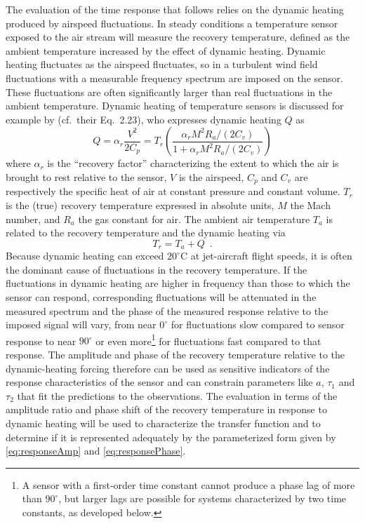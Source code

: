 \documentclass[11pt,twoside,american,12pt,twoside,american]{article}\usepackage[]{graphicx}\usepackage[]{color}
\begin{document}
The evaluation of the time response that follows relies on the dynamic
heating produced by airspeed fluctuations. In steady conditions a
temperature sensor exposed to the air stream will measure the recovery
temperature, defined as the ambient temperature increased by the effect
of dynamic heating. Dynamic heating fluctuates as the airspeed fluctuates,
so in a turbulent wind field fluctuations with a measurable frequency
spectrum are imposed on the sensor. These fluctuations are often significantly
larger than real fluctuations in the ambient temperature. Dynamic
heating of temperature sensors is discussed for example by \citet{BangeEtAl2013.ch2}
(cf.~their Eq.~2.23), who expresses dynamic heating $Q$ as\\
\begin{equation}
Q=\alpha_{r}\frac{V^{2}}{2C_{p}}=T_{r}\left(\frac{\alpha_{r}M^{2}R_{a}/(2C_{v})}{1+\alpha_{r}M^{2}R_{a}/(2C_{v})}\right)\label{eq:DHterm}
\end{equation}
where $\alpha_{r}$ is the ``recovery factor'' characterizing the
extent to which the air is brought to rest relative to the sensor,
$V$ is the airspeed, $C_{p}$ and $C_{v}$ are respectively the specific
heat of air at constant pressure and constant volume. $T_{r}$ is
the (true) recovery temperature expressed in absolute units, $M$
the Mach number, and $R_{a}$ the gas constant for air. The ambient
air temperature $T_{a}$ is related to the recovery temperature and
the dynamic heating via\\
\begin{equation}
T_{r}=T_{a}+Q\,\,\,.\label{eq:recoveryTemperature}
\end{equation}
Because dynamic heating can exceed $20^{\circ}\mathrm{C}$ at jet-aircraft
flight speeds, it is often the dominant cause of fluctuations in the
recovery temperature. If the fluctuations in dynamic heating are higher
in frequency than those to which the sensor can respond, corresponding
fluctuations will be attenuated in the measured spectrum and the phase
of the measured response relative to the imposed signal will vary,
from near $0^{\circ}$ for fluctuations slow compared to sensor response
to near $90^{\circ}$ or even more\footnote{A sensor with a first-order time constant cannot produce a phase lag
of more than $90^{\circ}$, but larger lags are possible for systems
characterized by two time constants, as developed below.} for fluctuations fast compared to that response. The amplitude and
phase of the recovery temperature relative to the dynamic-heating
forcing therefore can be used as sensitive indicators of the response
characteristics of the sensor and can constrain parameters like $a$,
$\tau_{1}$ and $\tau_{2}$ that fit the predictions to the observations.
The evaluation in terms of the amplitude ratio and phase shift of
the recovery temperature in response to dynamic heating will be used
to characterize the transfer function and to determine if it is represented
adequately by the parameterized form given by \eqref{eq:responseAmp}
and \eqref{eq:responsePhase}.
\end{document}
